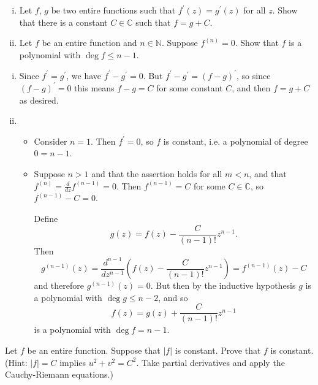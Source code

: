 \documentclass{article}
\newcounter{Problem}
\newenvironment{Problem}{\begin{Exercise}[name={Problem},
                                          counter={Problem}]}
                        {\end{Exercise}}
\begin{document}
\begin{Problem}
  \begin{enumerate}[(i)]
    \item{
      Let $f$, $g$ be two entire functions such that
      $f^\prime(z) = g^\prime(z)$ for all $z$. Show that there is a
      constant $C \in \mathbb{C}$ such that $f = g + C$.
    }
    \item{
      Let $f$ be an entire function and $n \in \mathbb{N}$.
      Suppose $f^{(n)} = 0$. Show that $f$ is a polynomial
      with $\deg f \leq n - 1$.
    }
  \end{enumerate}
\end{Problem}

\begin{Answer}
  \begin{enumerate}[(i)]
    \item{
      Since $f^\prime = g^\prime$, we have $f^\prime - g^\prime = 0$.
      But $f^\prime - g^\prime = (f - g)^\prime$, so since
      $(f - g)^\prime = 0$ this means $f - g = C$ for some constant
      $C$, and then $f = g + C$ as desired.
    }
    \item{
      \begin{itemize}
        \item{
          Consider $n = 1$. Then $f^\prime = 0$, so $f$ is constant,
          i.e. a polynomial of degree $0 = n - 1$.
        }
        \item{
          Suppose $n > 1$ and that the assertion holds for all
          $m < n$, and that $f^{(n)} = \frac{d}{dz} f^{(n-1)} = 0$. Then
          $f^{(n-1)} = C$ for some $C \in \mathbb{C}$,
          so $f^{(n-1)} - C = 0$.

          Define
          $$
          g(z) = f(z) - \frac{C}{(n-1)!} z^{n-1}.
          $$
          Then
          $$
            g^{(n-1)}(z)
          = \frac{d^{n-1}}{dz^{n-1}} \left( f(z) - \frac{C}{(n-1)!}
            z^{n-1} \right)
          = f^{(n-1)}(z) - C
          $$
          and therefore $g^{(n-1)}(z) = 0$. But then by the inductive
          hypothesis $g$ is a polynomial with $\deg g \leq n - 2$, and
          so
          $$
          f(z) = g(z) + \frac{C}{(n-1)!}z^{n-1}
          $$
          is a polynomial with $\deg f = n - 1$.
        }
      \end{itemize}
    }
  \end{enumerate}
\end{Answer}

\begin{Problem}
  Let $f$ be an entire function. Suppose that $|f|$ is constant. Prove
  that $f$ is constant.
  (Hint: $|f| = C$ implies $u^2 + v^2 = C^2$. Take partial derivatives
  and apply the Cauchy-Riemann equations.)
\end{Problem}
\end{document}
